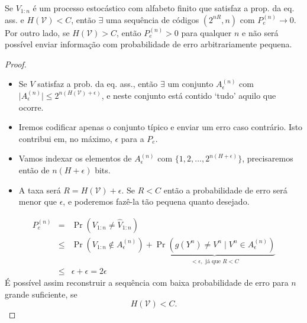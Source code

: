 \begin{frame}[allowframebreaks]
  \begin{theorem}
  Se $V_{1:n}$ é um processo estocástico com alfabeto finito que satisfaz a prop. da eq. ass.
  e $H(\mathcal{V}) < C$,  então $\exists$ uma sequência de códigos $(2^{nR},n)$ com
  $P_e^{(n)} \rightarrow 0$. Por outro lado, se $H(\mathcal{V}) > C$,
  então $P_e^{(n)} > 0$ para qualquer $n$ e não será possível enviar informação com 
  probabilidade de erro arbitrariamente pequena.
  \end{theorem}

  \framebreak
  \begin{proof}
  \begin{itemize}
  \item Se $V$ satisfaz a prob. da eq. ass., então $\exists$ um conjunto $A_{\epsilon}^{(n)}$ 
	com $\vert A_{\epsilon}^{(n)} \vert \leq 2^{n(H(\mathcal{V}) + \epsilon)}$, e neste conjunto
	está contido `tudo' aquilo que ocorre.
  \item Iremos codificar apenas o conjunto típico e enviar um erro caso contrário.
	Isto contribui em, no máximo, $\epsilon$ para a $P_e$.
  \item Vamos indexar os elementos de $A_{\epsilon}^{(n)}$ com $\{1,2,\ldots,2^{n(H+\epsilon)}\}$, 
	precisaremos então de $n(H+\epsilon)$ bits.
  \item A taxa será $R = H(\mathcal{V}) + \epsilon$. Se $R < C$ então a probabilidade de erro 
	será menor que $\epsilon$, e poderemos fazê-la tão pequena quanto desejado.
  \end{itemize}

  \proofbreak

  \begin{eqnarray}
  P_e^{(n)} &=& \Pr(V_{1:n} \neq \hat{V}_{1:n}) \nonumber \\
		&\leq& \Pr(V_{1:n} \notin A_{\epsilon}^{(n)}) + \underbrace{ \Pr(g(Y^n) \neq V^n \mid V^n \in A_{\epsilon}^{(n)} ) }_{< \epsilon , \text{ já que } R < C} \nonumber \\
		&\leq& \epsilon + \epsilon = 2 \epsilon
  \end{eqnarray}
  É possível assim reconstruir a sequência com baixa probabilidade de erro para $n$ grande suficiente, se
  \begin{equation}
  H(\mathcal{V}) < C .
  \end{equation}
  \end{proof}


\end{frame}
